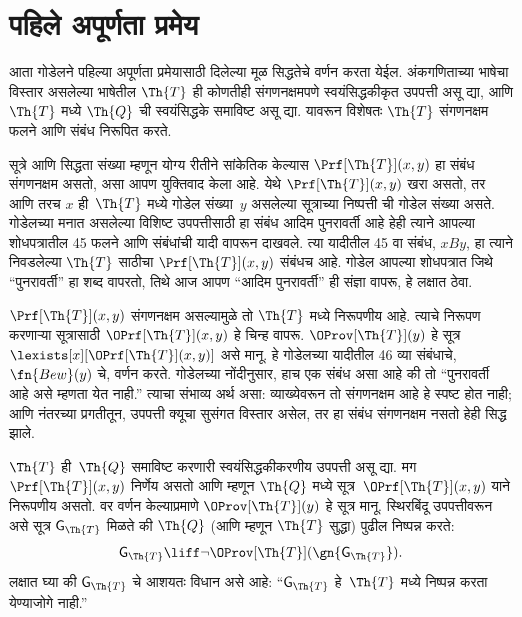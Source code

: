 \section{पहिले अपूर्णता प्रमेय}\label{inc:inp:1in:sec}

आता गोडेलने पहिल्या अपूर्णता प्रमेयासाठी दिलेल्या मूळ
सिद्धतेचे वर्णन करता येईल. अंकगणिताच्या भाषेचा विस्तार
असलेल्या भाषेतील $\Th{T}$ ही कोणतीही संगणनक्षमपणे
स्वयंसिद्धकीकृत उपपत्ती असू द्या, आणि $\Th{T}$ मध्ये
$\Th{Q}$ ची स्वयंसिद्धके समाविष्ट असू द्या. यावरून
विशेषतः $\Th{T}$ संगणनक्षम फलने आणि संबंध
निरूपित करते.

सूत्रे आणि सिद्धता संख्या म्हणून योग्य रीतीने सांकेतिक
केल्यास $\Prf[\Th{T}](x,y)$ हा संबंध संगणनक्षम
असतो, असा आपण युक्तिवाद केला आहे. येथे
$\Prf[\Th{T}](x,y)$ खरा असतो, तर आणि तरच
$x$ ही~$\Th{T}$ मध्ये गोडेल संख्या~$y$
असलेल्या सूत्राच्या निष्पत्ती
ची गोडेल संख्या असते. गोडेलच्या मनात असलेल्या
विशिष्ट उपपत्तीसाठी हा संबंध आदिम पुनरावर्ती आहे
हेही त्याने आपल्या शोधपत्रातील 45 फलने आणि
संबंधांची यादी वापरून दाखवले. त्या यादीतील
45 वा संबंध, $x B y$, हा त्याने निवडलेल्या
$\Th{T}$ साठीचा $\Prf[\Th{T}](x,y)$
संबंधच आहे. गोडेल आपल्या शोधपत्रात जिथे
“पुनरावर्ती” हा शब्द वापरतो, तिथे आज आपण
“आदिम पुनरावर्ती” ही संज्ञा वापरू, हे लक्षात ठेवा.

$\Prf[\Th{T}](x,y)$ संगणनक्षम असल्यामुळे
तो $\Th{T}$ मध्ये निरूपणीय आहे. त्याचे
निरूपण करणाऱ्या सूत्रासाठी
$\OPrf[\Th{T}](x,y)$ हे चिन्ह वापरू.
$\OProv[\Th{T}](y)$ हे सूत्र
$\lexists[x][\OPrf[\Th{T}](x,y)]$
असे मानू. हे गोडेलच्या यादीतील 46 व्या
संबंधाचे, $ \fn{Bew}(y)$ चे, वर्णन करते.
गोडेलच्या नोंदीनुसार, हाच एक संबंध असा
आहे की तो “पुनरावर्ती आहे असे म्हणता येत
नाही.” त्याचा संभाव्य अर्थ असा: व्याख्येवरून
तो संगणनक्षम आहे हे स्पष्ट होत नाही; आणि
नंतरच्या प्रगतीतून, उपपत्ती क्यूचा सुसंगत विस्तार असेल,
तर हा संबंध संगणनक्षम नसतो हेही सिद्ध झाले.

$\Th{T}$ ही~$\Th{Q}$ समाविष्ट करणारी
स्वयंसिद्धकीकरणीय उपपत्ती असू द्या. मग
$\Prf[\Th{T}](x, y)$ निर्णेय असतो आणि
म्हणून $\Th{Q}$ मध्ये
सूत्र~$\OPrf[\Th{T}](x, y)$
याने निरूपणीय असतो. वर वर्णन केल्याप्रमाणे
$\OProv[\Th{T}](y)$ हे सूत्र मानू.
स्थिरबिंदू उपपत्तीवरून असे सूत्र
$\mathsf{G}_\Th{T}$ मिळते की $\Th{Q}$
(आणि म्हणून $\Th{T}$ सुद्धा) पुढील
निष्पन्न करते:
\begin{equation}
\label{inc:inp:1in:eqn:qpf}
\mathsf{G}_\Th{T} \liff \lnot \OProv[\Th{T}](\gn{\mathsf{G}_\Th{T}}).
\end{equation}
लक्षात घ्या की $\mathsf{G}_\Th{T}$ चे
आशयतः विधान असे आहे: “$\mathsf{G}_\Th{T}$
हे~$\Th{T}$ मध्ये निष्पन्न करता येण्याजोगे नाही.”

